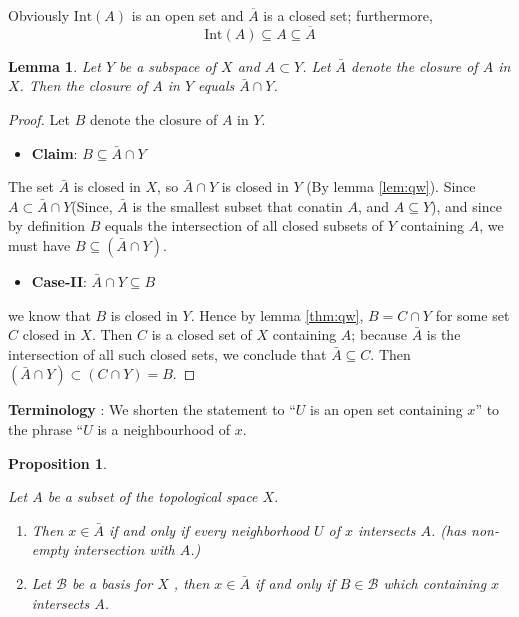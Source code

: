 \documentclass[
]{book}
\providecommand{\tightlist}{%
  \setlength{\itemsep}{0pt}\setlength{\parskip}{0pt}}
\newtheorem{lemma}{Lemma}[chapter]
\newtheorem{proposition}{Proposition}[chapter]
\theoremstyle{definition}
\theoremstyle{definition}
\theoremstyle{definition}
\theoremstyle{definition}
\theoremstyle{remark}
\begin{document}
Obviously \(\text{Int}(A)\) is an open set and \(\overline{A}\) is a closed set; furthermore,
\[\text{Int}(A) \subseteq A \subseteq \overline{A}\]

\begin{lemma}
\protect\hypertarget{lem:unnamed-chunk-66}{}\label{lem:unnamed-chunk-66}Let \(Y\) be a subspace of \(X\) and \(A\subset Y\). Let \(\bar{A}\) denote the closure of \(A\) in \(X\). Then the closure of \(A\) in \(Y\) equals \(\bar{A} \cap Y\).
\end{lemma}

\begin{proof}
Let \(B\) denote the closure of \(A\) in \(Y\).

\begin{itemize}
\tightlist
\item
  \textbf{Claim}: \(B \subseteq \bar{A}\cap Y\)
\end{itemize}

The set \(\bar{A}\) is closed in \(X\), so \(\bar{A} \cap Y\) is closed in \(Y\) (By lemma \ref{lem:qw}). Since \(A\subset \bar{A}\cap Y\)(Since, \(\bar{A}\) is the smallest subset that conatin \(A\), and \(A\subseteq Y\)), and since by definition \(B\) equals the intersection of all closed subsets of \(Y\) containing \(A\), we must have \(B \subseteq (\bar{A} \cap Y)\).

\begin{itemize}
\tightlist
\item
  \textbf{Case-II}: \(\bar{A}\cap Y \subseteq B\)
\end{itemize}

we know that \(B\) is closed in \(Y\). Hence by lemma \ref{thm:qw}, \(B = C \cap Y\) for some set \(C\) closed in \(X\). Then \(C\) is a closed set of \(X\) containing \(A\); because \(\bar{A}\) is the intersection of all such closed sets, we conclude that \(\bar{A} \subseteq C\). Then
\((\bar{A}\cap Y ) \subset (C \cap Y ) = B\).
\end{proof}

\textbf{Terminology} : We shorten the statement to ``\(U\) is an open set containing \(x\)'' to the phrase ``\(U\) is a neighbourhood of \(x\).

\begin{proposition}
\protect\hypertarget{prp:prop1}{}\label{prp:prop1}

Let \(A\) be a subset of the topological space \(X\).

\begin{enumerate}
\def\labelenumi{\alph{enumi})}
\item
  Then \(x \in \bar{A}\) if and only if every neighborhood \(U\) of \(x\) intersects \(A\). (has non-empty intersection with \(A\).)
\item
  Let \(\mathcal{B}\) be a basis for \(X\) , then \(x \in \bar{A}\) if and only if \(B\in \mathcal{B}\) which containing \(x\) intersects \(A\).
\end{enumerate}

\end{proposition}
\end{document}
